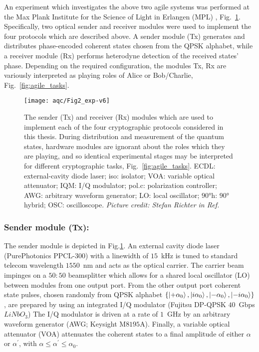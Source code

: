 An experiment which investigates the above two agile systems was performed at the Max Plank Institute for the Science of Light in Erlangen (MPL) \cite{Richter2020}, Fig.~\ref{fig:aqc_experiment}. Specifically, two optical sender and receiver modules were used to implement the four protocols which are described above. A sender module (Tx) generates and distributes phase-encoded coherent states chosen from the QPSK alphabet, while a receiver module (Rx) performs heterodyne detection of the received states' phase. Depending on the required configuration, the modules Tx, Rx are variously interpreted as playing roles of Alice or Bob/Charlie, Fig.~\ref{fig:agile_tasks}. 

\begin{figure}[htp]
\centering
\texttt{[image: aqc/Fig2\_exp-v6]}
\caption{\label{fig:aqc_experiment} The sender (Tx) and receiver (Rx) modules which are used to implement each of the four cryptographic protocols considered in this thesis. During distribution and measurement of the quantum states, hardware modules are ignorant about the roles which they are playing, and so identical experimental stages may be interpreted for different cryptographic tasks, Fig.~\ref{fig:agile_tasks}. ECDL: external-cavity diode laser; iso: isolator; VOA: variable optical attenuator; IQM: I/Q modulator; pol.c: polarization controller; AWG: arbitrary waveform generator; LO: local oscillator; $90\si{\degree}$h: $90\si{\degree}$ hybrid; OSC: oscilloscope. \emph{Picture credit: Stefan Richter in Ref.~\cite{Richter2020}}}
\end{figure}

\subsubsection{Sender module (Tx):} The sender module is depicted in Fig.\ref{fig:aqc_experiment}. An external cavity diode laser (PurePhotonics PPCL-$300$) with a linewidth of $15$~kHz is tuned to standard telecom wavelength $1550$~nm and acts as the optical carrier. The carrier beam impinges on a $50:50$ beamsplitter which allows for a shared local oscillator (LO) between modules from one output port. From the other output port  coherent state pulses, chosen randomly from QPSK alphabet $\left\{ \ket{+ \alpha_0}, \ket{i \alpha_0}, \ket{-\alpha_0}, \ket{-i \alpha_0}\right\}$, are prepared by using an integrated I/Q modulator (Fujitsu DP-QPSK $40$~Gbps $LiNbO_3$)%
The I/Q modulator is driven at a rate of $1$~GHz by an arbitrary waveform generator (AWG; Keysight M$8195$A). Finally, a variable optical attenuator (VOA) attenuates the coherent states to a final amplitude of either $\alpha$ or $\alpha^\prime$, with $\alpha \le \alpha^\prime \le \alpha_0$.

